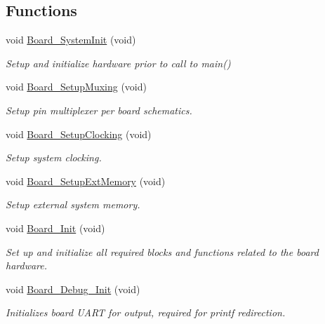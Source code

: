 \subsection*{Functions}
\begin{DoxyCompactItemize}
\item 
void \hyperlink{group___b_o_a_r_d___c_o_m_m_o_n___a_p_i_gaeb60ea85499a4208167ae2540086516a}{Board\+\_\+\+System\+Init} (void)
\begin{DoxyCompactList}\small\item\em Setup and initialize hardware prior to call to main() \end{DoxyCompactList}\item 
void \hyperlink{group___b_o_a_r_d___c_o_m_m_o_n___a_p_i_ga8ac1dc465c66e1cc00f5ffd346904d97}{Board\+\_\+\+Setup\+Muxing} (void)
\begin{DoxyCompactList}\small\item\em Setup pin multiplexer per board schematics. \end{DoxyCompactList}\item 
void \hyperlink{group___b_o_a_r_d___c_o_m_m_o_n___a_p_i_gae417dc93d00f1a89f74220e569fac777}{Board\+\_\+\+Setup\+Clocking} (void)
\begin{DoxyCompactList}\small\item\em Setup system clocking. \end{DoxyCompactList}\item 
void \hyperlink{group___b_o_a_r_d___c_o_m_m_o_n___a_p_i_ga27d97e44ce026a509b12317e059b2204}{Board\+\_\+\+Setup\+Ext\+Memory} (void)
\begin{DoxyCompactList}\small\item\em Setup external system memory. \end{DoxyCompactList}\item 
void \hyperlink{group___b_o_a_r_d___c_o_m_m_o_n___a_p_i_gae8d2d761b984f48c3dbb27dd32a8c119}{Board\+\_\+\+Init} (void)
\begin{DoxyCompactList}\small\item\em Set up and initialize all required blocks and functions related to the board hardware. \end{DoxyCompactList}\item 
void \hyperlink{group___b_o_a_r_d___c_o_m_m_o_n___a_p_i_gabcba073f50ad637ee6bc852f64ea2ce6}{Board\+\_\+\+Debug\+\_\+\+Init} (void)
\begin{DoxyCompactList}\small\item\em Initializes board U\+A\+R\+T for output, required for printf redirection. \end{DoxyCompactList}\item 

\end{DoxyCompactItemize}
